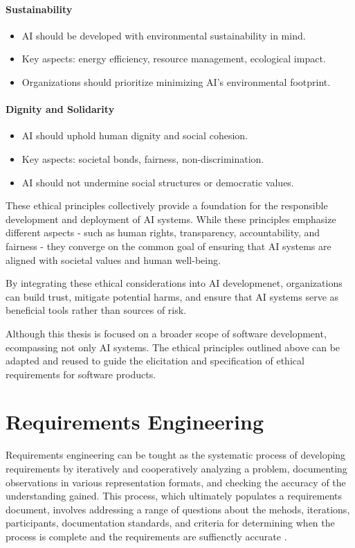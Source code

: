 \paragraph{Sustainability}
\begin{itemize}
    \item AI should be developed with environmental sustainability in mind.
    \item Key aspects: energy efficiency, resource management, ecological impact.
    \item Organizations should prioritize minimizing AI’s environmental footprint.
\end{itemize}

\paragraph{Dignity and Solidarity}
\begin{itemize}
    \item AI should uphold human dignity and social cohesion.
    \item Key aspects: societal bonds, fairness, non-discrimination.
    \item AI should not undermine social structures or democratic values.
\end{itemize}

These ethical principles collectively provide a foundation for the responsible development and deployment of AI systems. While these principles emphasize different aspects - such as human rights, 
transparency, accountability, and fairness - they converge on the common goal of ensuring that AI systems are aligned with societal values and human well-being.

By integrating these ethical considerations into AI developmenet, organizations can build trust, mitigate potential harms, and ensure that AI systems serve as beneficial tools rather than sources of risk.

Although this thesis is focused on a broader scope of software development, ecompassing not only AI systems. The ethical principles outlined above can be adapted and reused to guide the elicitation
and specification of ethical requirements for software products.


\section{Requirements Engineering}
Requirements engineering can be tought as the systematic process of developing requirements by iteratively and cooperatively analyzing a problem, documenting observations in various representation formats, and checking the accuracy
of the understanding gained. This process, which ultimately populates a requirements document, involves addressing a range of questions about the mehods, iterations, participants, documentation standards, and criteria for 
determining when the process is complete and the requirements are suffienctly accurate \cite{macaulay2012requirements}.


